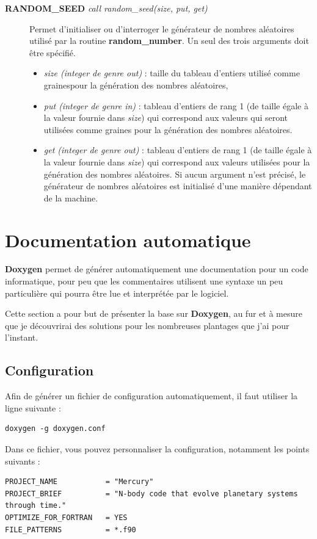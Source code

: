 \documentclass[a4paper,twoside]{article}
\begin{document}
\begin{description}
\item[\textbf{RANDOM\_SEED} \emph{call random\_seed(size, put, get)}] Permet d'initialiser ou d'interroger le gé\-né\-ra\-teur de nombres aléatoires utilisé par la routine \textbf{random\_number}. Un seul des trois arguments doit être spécifié. 
\begin{itemize}
\item \emph{size (integer de genre out)} : taille du tableau d'entiers utilisé comme \og graines\fg pour la génération des nombres aléatoires,
\item \emph{put (integer de genre in)} : tableau d'entiers de rang 1 (de taille égale à la valeur fournie dans \emph{size}) qui correspond aux valeurs qui seront utilisées comme graines pour la génération des nombres aléatoires.
\item \emph{get (integer de genre out)} : tableau d'entiers de rang 1 (de taille égale à la valeur fournie dans \emph{size}) qui correspond aux valeurs utilisées pour la génération des nombres aléatoires. Si aucun argument n'est précisé, le générateur de nombres aléatoires est initialisé d'une manière dépendant de la machine.
\end{itemize}
\end{description}

\section{Documentation automatique}
\textbf{Doxygen} permet de générer automatiquement une documentation pour un code informatique, pour peu que les commentaires utilisent une syntaxe un peu particulière qui pourra être lue et interprétée par le logiciel. 

Cette section a pour but de présenter la base sur \textbf{Doxygen}, au fur et à mesure que je découvrirai des solutions pour les nombreuses plantages que j'ai pour l'instant.

\subsection{Configuration}
Afin de générer un fichier de configuration automatiquement, il faut utiliser la ligne suivante : 
\begin{verbatim}
doxygen -g doxygen.conf
\end{verbatim}

Dans ce fichier, vous pouvez personnaliser la configuration, notamment les points suivants : 
\begin{verbatim}
PROJECT_NAME           = "Mercury"
PROJECT_BRIEF          = "N-body code that evolve planetary systems through time."
OPTIMIZE_FOR_FORTRAN   = YES
FILE_PATTERNS          = *.f90
\end{verbatim}
\end{document}
